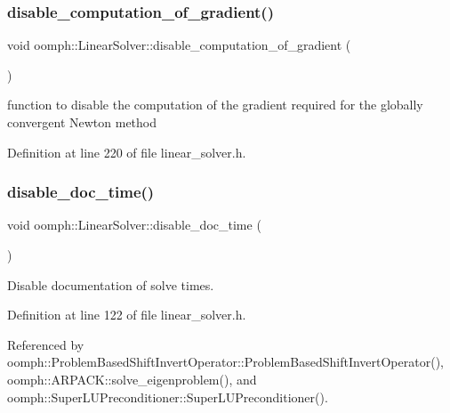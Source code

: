 \subsubsection{\texorpdfstring{disable\+\_\+computation\+\_\+of\+\_\+gradient()}{disable\_computation\_of\_gradient()}}
{\footnotesize\ttfamily void oomph\+::\+Linear\+Solver\+::disable\+\_\+computation\+\_\+of\+\_\+gradient (\begin{DoxyParamCaption}{ }\end{DoxyParamCaption})\hspace{0.3cm}{\ttfamily [inline]}}



function to disable the computation of the gradient required for the globally convergent Newton method 



Definition at line 220 of file linear\+\_\+solver.\+h.

\mbox{\label{classoomph_1_1LinearSolver_a91ffe51f3de82dad1a110c099f256d73}} 
\subsubsection{\texorpdfstring{disable\+\_\+doc\+\_\+time()}{disable\_doc\_time()}}
{\footnotesize\ttfamily void oomph\+::\+Linear\+Solver\+::disable\+\_\+doc\+\_\+time (\begin{DoxyParamCaption}{ }\end{DoxyParamCaption})\hspace{0.3cm}{\ttfamily [inline]}}



Disable documentation of solve times. 



Definition at line 122 of file linear\+\_\+solver.\+h.



Referenced by oomph\+::\+Problem\+Based\+Shift\+Invert\+Operator\+::\+Problem\+Based\+Shift\+Invert\+Operator(), oomph\+::\+A\+R\+P\+A\+C\+K\+::solve\+\_\+eigenproblem(), and oomph\+::\+Super\+L\+U\+Preconditioner\+::\+Super\+L\+U\+Preconditioner().

\mbox{\label{classoomph_1_1LinearSolver_ad61c63af94c5961830bd9807225a48d6}} 
